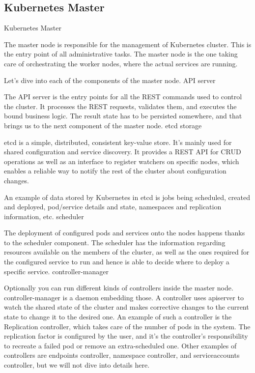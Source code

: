 \documentclass{bredelebeamer}
\begin{document}
\subsection{Kubernetes Master}
\begin{frame}{Kubernetes Master}




The master node is responsible for the management of Kubernetes cluster. This is the entry point of all administrative tasks. The master node is the one taking care of orchestrating the worker nodes, where the actual services are running.

Let's dive into each of the components of the master node.
API server

The API server is the entry points for all the REST commands used to control the cluster. It processes the REST requests, validates them, and executes the bound business logic. The result state has to be persisted somewhere, and that brings us to the next component of the master node.
etcd storage

etcd is a simple, distributed, consistent key-value store. It’s mainly used for shared configuration and service discovery.
It provides a REST API for CRUD operations as well as an interface to register watchers on specific nodes, which enables a reliable way to notify the rest of the cluster about configuration changes.

An example of data stored by Kubernetes in etcd is jobs being scheduled, created and deployed, pod/service details and state, namespaces and replication information, etc.
scheduler

The deployment of configured pods and services onto the nodes happens thanks to the scheduler component.
The scheduler has the information regarding resources available on the members of the cluster, as well as the ones required for the configured service to run and hence is able to decide where to deploy a specific service.
controller-manager

Optionally you can run different kinds of controllers inside the master node. controller-manager is a daemon embedding those.
A controller uses apiserver to watch the shared state of the cluster and makes corrective changes to the current state to change it to the desired one.
An example of such a controller is the Replication controller, which takes care of the number of pods in the system. The replication factor is configured by the user, and it's the controller’s responsibility to recreate a failed pod or remove an extra-scheduled one.
Other examples of controllers are endpoints controller, namespace controller, and serviceaccounts controller, but we will not dive into details here.
\end{frame}
\end{document}
